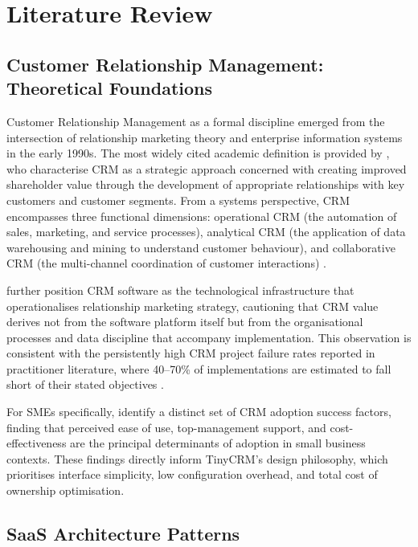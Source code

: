 \chapter{Literature Review}
\label{chap:01}
\setlength{\parskip}{1em}

\section{Customer Relationship Management: Theoretical Foundations}

Customer Relationship Management as a formal discipline emerged from the
intersection of relationship marketing theory and enterprise information
systems in the early 1990s. The most widely cited academic definition is
provided by \citet{payne2005}, who characterise CRM as a strategic approach
concerned with creating improved shareholder value through the development
of appropriate relationships with key customers and customer segments. From
a systems perspective, CRM encompasses three functional dimensions:
operational CRM (the automation of sales, marketing, and service
processes), analytical CRM (the application of data warehousing and mining
to understand customer behaviour), and collaborative CRM (the
multi-channel coordination of customer interactions) \citep{buttle2019}.

\citet{buttle2019} further position CRM software as the technological
infrastructure that operationalises relationship marketing strategy,
cautioning that CRM value derives not from the software platform itself
but from the organisational processes and data discipline that accompany
implementation. This observation is consistent with the persistently high
CRM project failure rates reported in practitioner literature, where
40--70\% of implementations are estimated to fall short of their stated
objectives \citep{gartner2023crm}.

For SMEs specifically, \citet{nguyen2013} identify a distinct set of CRM
adoption success factors, finding that perceived ease of use,
top-management support, and cost-effectiveness are the principal
determinants of adoption in small business contexts. These findings
directly inform TinyCRM's design philosophy, which prioritises interface
simplicity, low configuration overhead, and total cost of ownership
optimisation.

\section{SaaS Architecture Patterns}

